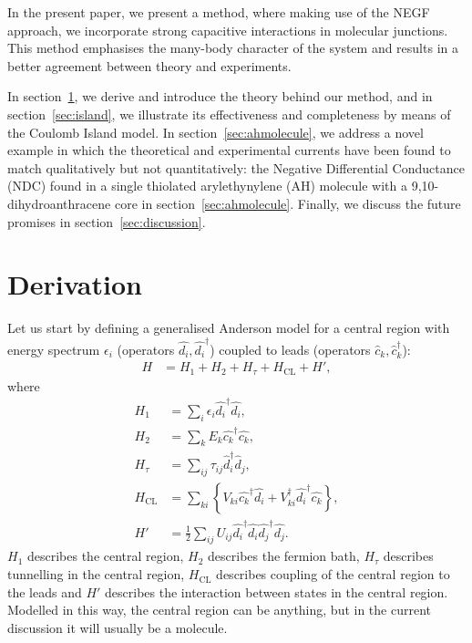 \documentclass{article}
\begin{document}
\begin{multicols}{2}
        In the present paper, we present a method, where making use of the NEGF approach, we incorporate strong capacitive interactions  in molecular junctions. This method emphasises the many-body character of the system and results in a better agreement between theory and experiments.
        
        In section~\ref{sec:derivation}, we derive and introduce the theory behind our method, and in section~\ref{sec:island}, we illustrate its effectiveness and completeness by means of the Coulomb Island model. In section~\ref{sec:ahmolecule}, we address a novel example in which the theoretical and experimental currents have been found to match qualitatively but not quantitatively: the Negative Differential Conductance (NDC) found in a single thiolated arylethynylene (AH) molecule with a 9,10-dihydroanthracene core in section~\ref{sec:ahmolecule}. Finally, we discuss the future promises in section~\ref{sec:discussion}.

    
    \section{Derivation}\label{sec:derivation}
        Let us start by defining a generalised Anderson model for a central region with energy spectrum $\epsilon_i$ (operators $\hat{d_i}, \hat{d_i}^\dagger$) coupled to leads (operators $\hat{c}_k, \hat{c}_k^\dagger$):
        \begin{align}
            H &= H_1 + H_2 + H_\tau + H_\text{CL} + H', \label{eq:hamiltonian}
        \end{align}
        where
        \begin{align*}
        H_1 &= \sum_i \epsilon_i \hat{d_i}^\dagger \hat{d_i}, \\
        H_2 &= \sum_k E_k \hat{c_k}^\dagger \hat{c_k}, \\
        H_\tau &= \sum_{ij} \tau_{ij} \hat{d}_i^\dagger \hat{d}_j, \\
        H_\text{CL} &= \sum_{ki}\left\{ V_{ki} \hat{c_k}^\dagger \hat{d_i} +  V_{ki}^\dagger \hat{d_i}^\dagger \hat{c_k} \right\},\\
        H' &= \frac{1}{2} \sum_{ij} U_{ij} \hat{d_i}^\dagger \hat{d_i}\hat{d_j}^\dagger \hat{d_j}.
        \end{align*}
        $H_1$ describes the central region, $H_2$ describes the fermion bath, $H_\tau$ describes tunnelling in the central region, $H_\text{CL}$ describes coupling of the central region to the leads and $H'$ describes the interaction between states in the central region. Modelled in this way, the central region can be anything, but in the current discussion it will usually be a molecule.
    

\end{multicols}
\end{document}
